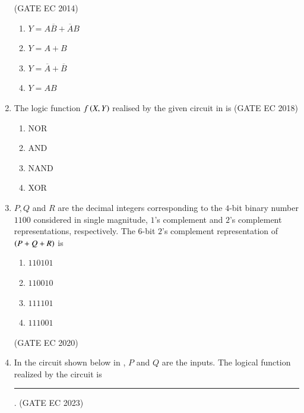 \begin{enumerate}[label=\arabic*.,ref=\theenumi]
\hfill (GATE EC 2014)
\begin{figure}[H]
\centering
\resizebox{0.75\columnwidth}{!}{%

	}
	\caption{}
\label{fig:GATE-EC 2014,15}
\end{figure}
\begin{enumerate}
    \item $Y= A\overline{B}+ \overline{A}B $ 
    \item $Y=A+B$
    \item $Y=\overline{A}+\overline{B}$
    \item $Y=AB$
\end{enumerate}
\item The logic function $f\left(X,Y\right)$ realised by the given circuit in
is
\hfill (GATE EC 2018)
\begin{figure}[H]
\centering
\resizebox{0.75\columnwidth}{!}{%

	}
	\caption{}
\label{fig:GATE-EC 2018,8}
\end{figure}
\begin{enumerate}
    \item NOR
    \item AND
    \item NAND
    \item XOR
\end{enumerate}
%
\item $P, Q$ and $R$ are the decimal integers corresponding to the  $4$-bit binary number  $1100$ considered in single magnitude, $1$'s complement and $2$'s complement representations, respectively. The $6$-bit $2$'s complement representation of $\left(P + Q + R\right)$ is
\begin{enumerate}
  \item $110101$
  \item $110010$
  \item $111101$
  \item $111001$
\end{enumerate}
   \hfill(GATE EC 2020)
%
\item In the circuit shown below
	in
,
	 $P$ and $Q$ are the inputs. The logical function realized by the circuit 
is \rule{1cm}{0.1pt}.
\hfill(GATE EC 2023)
\begin{figure}[H]
\centering
{}
\end{figure}
\end{enumerate}
